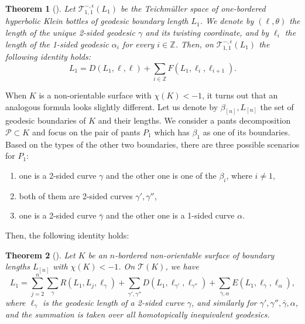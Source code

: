 \documentclass[12pt]{amsart}
\theoremstyle{plain}
\newtheorem{theorem}{Theorem}[section]
\theoremstyle{definition}
\theoremstyle{remark}
\numberwithin{equation}{section}
\begin{document}
\begin{theorem}[\cite{Nor07}]\label{prop:Nor07-1}
Let $\mathcal{T}_{1,1}^{-,\epsilon}(L_1)$ be the Teichm\"{u}ller space of one-bordered hyperbolic Klein bottles of geodesic boundary length $L_1$. We denote by $(\ell,\theta)$ the length of the unique 2-sided geodesic $\gamma$ and its twisting coordinate, and by $\ell_i$ the length of the 1-sided geodesic $\alpha_i$ for every $i\in\mathbb{Z}$. Then, on $\mathcal{T}_{1,1}^{-,\epsilon}(L_1)$ the following identity holds:
\begin{equation}
L_1=D(L_1,\ell,\ell)+\sum_{i\in\mathbb{Z}}F(L_1,\ell_i,\ell_{i+1}).\label{MN identity for KB}
\end{equation}
\end{theorem}

When $K$ is a non-orientable surface with $\chi(K)<-1$, it turns out that an analogous formula looks slightly different. Let us denote by $\beta_{[n]}, L_{[n]}$ the set of geodesic boundaries of $K$ and their lengths. We consider a pants decomposition $\mathcal{P}\subset K$ and focus on the pair of pants $P_1$ which has $\beta_1$ as one of its boundaries. Based on the types of the other two boundaries, there are three possible scenarios for $P_1$:
\begin{enumerate}
\item one is a 2-sided curve $\gamma$ and the other one is one of the $\beta_i$, where $i\neq1$,
\item both of them are 2-sided curves $\gamma',\gamma''$,
\item one is a 2-sided curve $\bar\gamma$ and the other one is a 1-sided curve $\alpha$.
\end{enumerate}
Then, the following identity holds:

\begin{theorem}[\cite{Nor07}]\label{prop:Nor07-2}
Let $K$ be an $n$-bordered non-orientable surface of boundary lengths $L_{[n]}$ with $\chi(K)<-1$. On $\mathcal{T}(K)$, we have
\begin{equation}
L_1=\sum_{j=2}^n\sum_{\gamma}R(L_1,L_j,\ell_\gamma)+\sum_{\gamma',\gamma''}D(L_1,\ell_{\gamma'},\ell_{\gamma''})+\sum_{\bar\gamma,\alpha}E(L_1,\ell_{\bar\gamma},\ell_\alpha),\label{MN identity}
\end{equation}
where $\ell_\gamma$ is the geodesic length of a 2-sided curve $\gamma$, and similarly for $\gamma',\gamma'',\bar\gamma, \alpha$, and the summation is taken over all homotopically inequivalent geodesics.
\end{theorem}
\end{document}

